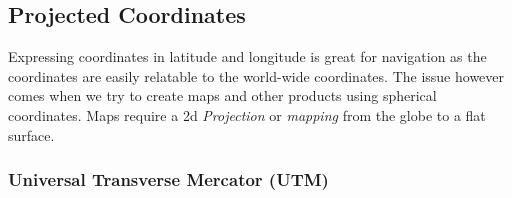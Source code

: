 \subsection*{Projected Coordinates}

Expressing coordinates in latitude and longitude is great for navigation 
as the coordinates are easily relatable to the world-wide coordinates. 
The issue however comes when we try to create maps and other products using
spherical coordinates.  Maps require a 2d \emph{Projection} or \emph{mapping}
from the globe to a flat surface.  


\subsubsection*{Universal Transverse Mercator (UTM)}




